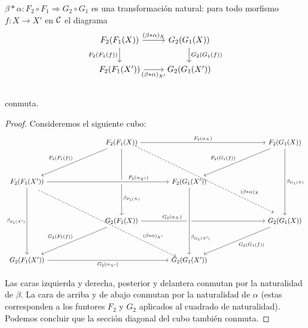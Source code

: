 \documentclass{article}
\numberwithin{equation}{section}
\theoremstyle{definition}
\begin{document}
\begin{observacion}
  $\beta\ast\alpha\colon F_2\circ F_1\Rightarrow G_2\circ G_1$ es una
  transformación natural: para todo morfismo $f\colon X\to X'$ en $\mathcal{C}$
  el diagrama
  \[ \begin{tikzcd}
      F_2 (F_1 (X)) \ar{r}{(\beta\ast\alpha)_X}\ar{d}[swap]{F_2 (F_1 (f))} & G_2 (G_1 (X))\ar{d}{G_2 (G_1 (f))} \\
      F_2 (F_1 (X')) \ar{r}[swap]{(\beta\ast\alpha)_{X'}} & G_2 (G_1 (X')) \\
    \end{tikzcd} \]
  conmuta.

  \begin{proof}
    Consideremos el siguiente cubo:
    \[ \begin{tikzcd}[row sep=4em, column sep=4em]
        && F_2 (F_1(X)) \ar{rrr}{F_2 (\alpha_X)}\ar[dashed,shift left=0.4em]{ddrrr}[near end]{(\beta\ast\alpha)_X}\ar[]{dd}[near end]{\beta_{F_1(X)}}\ar{dll}[swap]{F_2 (F_1 (f))} &&& F_2 (G_1(X))\ar{dd}{\beta_{G_1(X)}}\ar{dll}[swap]{F_2 (G_1 (f))} \\
        F_2 (F_1(X')) \ar[dashed,shift right=0.35em]{ddrrr}[near end]{(\beta\ast\alpha)_{X'}} \ar[crossing over]{rrr}[near end]{F_2 (\alpha_{X'})}\ar{dd}[swap]{\beta_{F_1(X')}} &&& F_2 (G_1(X')) \\
        && G_2 (F_1(X)) \ar{rrr}[near start]{G_2 (\alpha_X)}\ar{dll}[swap]{G_2 (F_1 (f))} &&& G_2 (G_1 (X))\ar{dll}{G_2 (G_1 (f))} \\
        G_2 (F_1(X')) \ar{rrr}[swap]{G_2 (\alpha_{X'})} &&& G_2 (G_1 (X'))\ar[leftarrow, crossing over]{uu}[near start,swap]{\beta_{G_1(X')}}
      \end{tikzcd} \]

    Las caras izquierda y derecha, posterior y delantera conmutan por la
    naturalidad de $\beta$. La cara de arriba y de abajo conmutan por la
    naturalidad de $\alpha$ (estas corresponden a los funtores $F_2$ y $G_2$
    aplicados al cuadrado de naturalidad). Podemos concluir que la sección
    diagonal del cubo también conmuta.
  \end{proof}
\end{observacion}
\end{document}
